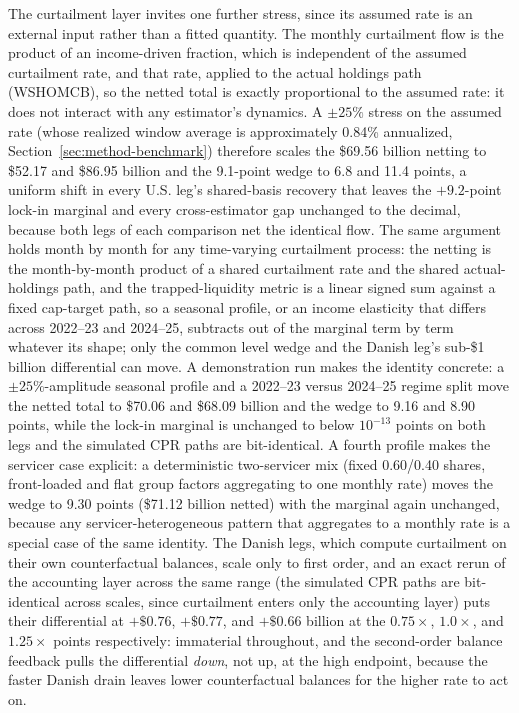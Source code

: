 \documentclass[12pt]{article}
\begin{document}
The curtailment layer invites one further stress, since its assumed rate is an external input rather than a fitted quantity. The monthly curtailment flow is the product of an income-driven fraction, which is independent of the assumed curtailment rate, and that rate, applied to the actual holdings path (WSHOMCB), so the netted total is exactly proportional to the assumed rate: it does not interact with any estimator's dynamics. A $\pm 25\%$ stress on the assumed rate (whose realized window average is approximately 0.84\% annualized, Section~\ref{sec:method-benchmark}) therefore scales the \$69.56 billion netting to \$52.17 and \$86.95 billion and the 9.1-point wedge to 6.8 and 11.4 points, a uniform shift in every U.S. leg's shared-basis recovery that leaves the $+9.2$-point lock-in marginal and every cross-estimator gap unchanged to the decimal, because both legs of each comparison net the identical flow. The same argument holds month by month for any time-varying curtailment process: the netting is the month-by-month product of a shared curtailment rate and the shared actual-holdings path, and the trapped-liquidity metric is a linear signed sum against a fixed cap-target path, so a seasonal profile, or an income elasticity that differs across 2022--23 and 2024--25, subtracts out of the marginal term by term whatever its shape; only the common level wedge and the Danish leg's sub-\$1 billion differential can move. A demonstration run makes the identity concrete: a $\pm 25\%$-amplitude seasonal profile and a 2022--23 versus 2024--25 regime split move the netted total to \$70.06 and \$68.09 billion and the wedge to 9.16 and 8.90 points, while the lock-in marginal is unchanged to below $10^{-13}$ points on both legs and the simulated CPR paths are bit-identical. A fourth profile makes the servicer case explicit: a deterministic two-servicer mix (fixed 0.60/0.40 shares, front-loaded and flat group factors aggregating to one monthly rate) moves the wedge to 9.30 points (\$71.12 billion netted) with the marginal again unchanged, because any servicer-heterogeneous pattern that aggregates to a monthly rate is a special case of the same identity. The Danish legs, which compute curtailment on their own counterfactual balances, scale only to first order, and an exact rerun of the accounting layer across the same range (the simulated CPR paths are bit-identical across scales, since curtailment enters only the accounting layer) puts their differential at $+\$0.76$, $+\$0.77$, and $+\$0.66$ billion at the $0.75\times$, $1.0\times$, and $1.25\times$ points respectively: immaterial throughout, and the second-order balance feedback pulls the differential \emph{down}, not up, at the high endpoint, because the faster Danish drain leaves lower counterfactual balances for the higher rate to act on.
\end{document}
